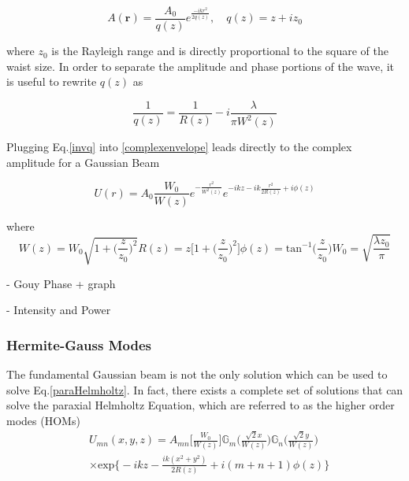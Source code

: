 \documentclass[oneside]{book}
\begin{document}
		\begin{equation} \label{complexenvelope}
		A(\mathbf{r}) = \frac{A_0}{q(z)} e^{\frac{-ikr^2}{2q(z)}} , \quad q(z)=z+iz_0
		\end{equation}
		
		where $z_0$ is the Rayleigh range and is directly proportional to the square of the waist size.  In order to separate the amplitude and phase portions of the wave, it is useful to rewrite $q(z)$ as
		
		\begin{equation}\label{invq}
		\frac{1}{q(z)} = \frac{1}{R(z)} - i \frac{\lambda}{\pi W^2(z)}
		\end{equation} 
		
		Plugging Eq.\ref{invq} into \ref{complexenvelope} leads directly to the complex amplitude for a Gaussian Beam
		
		\begin{equation}
		U(r) = A_0 \frac{W_0}{W(z)} e^{-\frac{r^2}{W^2(z)}} e^{-ikz - ik \frac{r^2}{2R(z)} + i \phi(z)}
		\end{equation}
		
		where
		\begin{subequations}
		\begin{equation}
		W(z) = W_0 \sqrt{1 + \bigg( \frac{z}{z_0} \bigg)^2}
		\end{equation}
		\begin{equation}
		R(z) = z \bigg[ 1 + \bigg( \frac{z}{z_0} \bigg)^2 \bigg]
		\end{equation}
		\begin{equation}
		\phi(z)= \text{tan}^{-1}\bigg(\frac{z}{z_0}\bigg)
		\end{equation}
		\begin{equation}
		W_0 = \sqrt{\frac{\lambda z_0}{\pi}}
		\end{equation}
		\end{subequations}

		
		- Gouy Phase + graph
		
		- Intensity and Power
		
		\subsubsection{Hermite-Gauss Modes}
		The fundamental Gaussian beam is not the only solution which can be used to solve Eq.\ref{paraHelmholtz}.  In fact, there exists a complete set of solutions that can solve the paraxial Helmholtz Equation, which are referred to as the higher order modes (HOMs)
		\begin{equation}\label{HG}
		\begin{aligned}
		&U_{mn}(x,y,z) = A_{mn}\bigg[ \frac{W_0}{W(z)} \bigg] \mathbb{G}_m\Bigg( \frac{\sqrt{2}x}{W(z)}  \Bigg) \mathbb{G}_n\Bigg( \frac{\sqrt{2}y}{W(z)} \Bigg)\\
		&\times \text{exp} \bigg\{ -ikz - \frac{ik(x^2+y^2)}{2R(z)} + i(m+n+1)\phi(z) \bigg\}
		\end{aligned}
		\end{equation}
		
\end{document}
